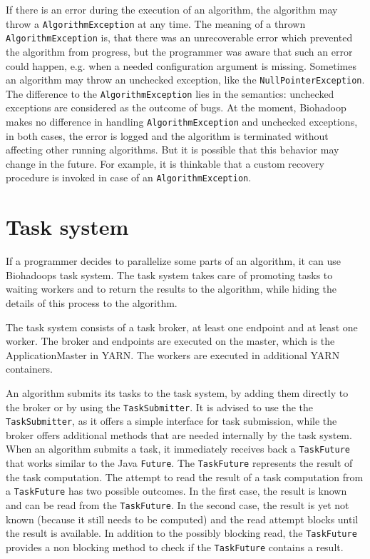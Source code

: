 If there is an error during the execution of an algorithm, the algorithm may throw a \texttt{AlgorithmException} at any time. The meaning of a thrown \texttt{AlgorithmException} is, that there was an unrecoverable error which prevented the algorithm from progress, but the programmer was aware that such an error could happen, e.g. when a needed configuration argument is missing. Sometimes an algorithm may throw an unchecked exception, like the \texttt{NullPointerException}. The difference to the \texttt{AlgorithmException} lies in the semantics: unchecked exceptions are considered as the outcome of bugs. At the moment, Biohadoop makes no difference in handling \texttt{AlgorithmException} and unchecked exceptions, in both cases, the error is logged and the algorithm is terminated without affecting other running algorithms. But it is possible that this behavior may change in the future. For example, it is thinkable that a custom recovery procedure is invoked in case of an \texttt{AlgorithmException}.

\section{Task system}
\label{chap:impl:task-system}
If a programmer decides to parallelize some parts of an algorithm, it can use Biohadoops task system. The task system takes care of promoting tasks to waiting workers and to return the results to the algorithm, while hiding the details of this process to the algorithm.

The task system consists of a task broker, at least one endpoint and at least one worker. The broker and endpoints are executed on the master, which is the ApplicationMaster in YARN. The workers are executed in additional YARN containers.

An algorithm submits its tasks to the task system, by adding them directly to the broker or by using the \texttt{TaskSubmitter}. It is advised to use the the \texttt{TaskSubmitter}, as it offers a simple interface for task submission, while the broker offers additional methods that are needed internally by the task system. When an algorithm submits a task, it immediately receives back a \texttt{TaskFuture} that works similar to the Java \texttt{Future}. The \texttt{TaskFuture} represents the result of the task computation. The attempt to read the result of a task computation from a \texttt{TaskFuture} has two possible outcomes. In the first case, the result is known and can be read from the \texttt{TaskFuture}. In the second case, the result is yet not known (because it still needs to be computed) and the read attempt blocks until the result is available. In addition to the possibly blocking read, the \texttt{TaskFuture} provides a non blocking method to check if the \texttt{TaskFuture} contains a result.


